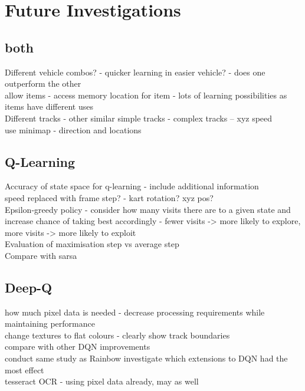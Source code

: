 
\chapter{Future Investigations}
\section{both}
Different vehicle combos? - quicker learning in easier vehicle? - does one outperform the other
\\ allow items - access memory location for item - lots of learning possibilities as items have different uses
\\Different tracks - other similar simple tracks - complex tracks -- xyz speed
\\ use minimap - direction and locations
\section{Q-Learning}
Accuracy of state space for q-learning - include additional information\\
speed replaced with frame step? - kart rotation? xyz pos?
\\ Epsilon-greedy policy - consider how many visits there are to a given state and increase chance of taking best accordingly - fewer visits -> more likely to explore, more visits -> more likely to exploit
\\ Evaluation of maximisation step vs average step
\\ Compare with sarsa

\section{Deep-Q}
how much pixel data is needed - decrease processing requirements while maintaining performance
\\ change textures to flat colours - clearly show track boundaries
\\ compare with other DQN improvements
\\ conduct same study as Rainbow \cite{hessel2018rainbow} investigate which extensions to DQN had the most effect
\\ tesseract OCR - using pixel data already, may as well
